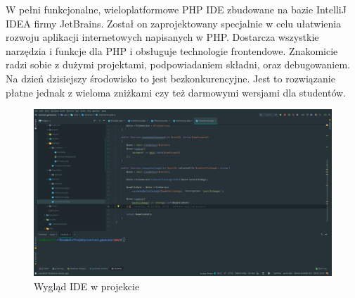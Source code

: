 W pełni funkcjonalne, wieloplatformowe PHP IDE zbudowane na bazie IntelliJ IDEA firmy JetBrains. Został on zaprojektowany specjalnie w celu ułatwienia rozwoju aplikacji internetowych napisanych w PHP. Dostarcza wszystkie narzędzia i funkcje dla PHP i obsługuje technologie frontendowe.
Znakomicie radzi sobie z dużymi projektami, podpowiadaniem składni, oraz debugowaniem.
Na dzień dzisiejszy środowisko to jest bezkonkurencyjne. Jest to rozwiązanie płatne jednak z wieloma zniżkami czy też darmowymi wersjami dla studentów.

\begin{figure}[!ht]
    \centering
    \includegraphics[width=6in]{images/phpstorm.png}
    \caption{Wygląd IDE  w projekcie \label{fig:phpstorm}}
\end{figure}